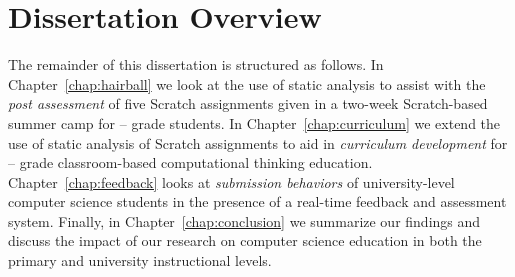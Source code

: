 \section{Dissertation Overview}
The remainder of this dissertation is structured as follows. In
Chapter~\ref{chap:hairball} we look at the use of static analysis to assist
with the \emph{post assessment} of five Scratch assignments given in a two-week
Scratch-based summer camp for -- grade students. In
Chapter~\ref{chap:curriculum} we extend the use of static analysis of Scratch
assignments to aid in \emph{curriculum development} for -- grade
classroom-based computational thinking education. Chapter~\ref{chap:feedback}
looks at \emph{submission behaviors} of university-level computer science
students in the presence of a real-time feedback and assessment
system. Finally, in Chapter~\ref{chap:conclusion} we summarize our findings and
discuss the impact of our research on computer science education in both the
primary and university instructional levels.
